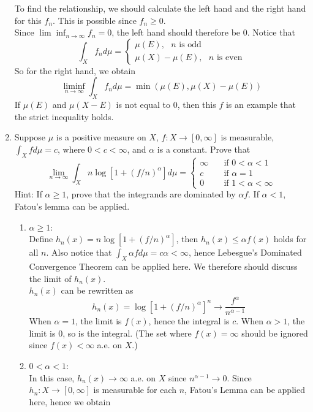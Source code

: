\documentclass{article}
\begin{document}
\begin{enumerate}
 	To find the relationship, we should calculate the left hand and the right hand for this $f_n$. This is possible since $f_n\geq0$.\\
 	Since $\lim\inf_{n\to\infty}f_n=0$, the left hand should therefore be $0$. Notice that
 	\[
 		\int_Xf_nd\mu=\begin{cases}
 		\mu(E),\text{ $n$ is odd}\\
 		\mu(X)-\mu(E),\text{ $n$ is even}
 		\end{cases}
 	\]
 	So for the right hand, we obtain
 	\[
 	\liminf_{n\to\infty}\int_Xf_nd\mu=\min(\mu(E),\mu(X)-\mu(E))
 	\]
 	If $\mu(E)$ and $\mu(X-E)$ is not equal to $0$, then this $f$ is an example that the strict inequality holds.
 	\item \exercise Suppose $\mu$ is a positive measure on $X$, $f:X\to[0,\infty]$ is measurable, $\int_Xfd\mu=c$, where $0<c<\infty$, and $\alpha$ is a constant. Prove that
 	\[
 		\lim\limits_{n\to\infty}\int_{X}n\log[1+(f/n)^{\alpha}]d\mu=\begin{cases}
 		\infty&\quad\text{if }0<\alpha<1\\
 		c&\quad\text{if }\alpha=1\\
 		0&\quad\text{if }1<\alpha<\infty
 		\end{cases}
 	\]
 	Hint: If $\alpha\geq1$, prove that the integrands are dominated by $\alpha f$. If $\alpha<1$, Fatou's lemma can be applied.\\
 	\solution
 	\begin{enumerate}
 		\item $\alpha\geq{1}$:\\
 			Define $h_n(x)=n\log[1+(f/n)^{\alpha}]$, then $h_n(x)\leq \alpha{f(x)}$ holds for all $n$. Also notice that $\int_{X}\alpha{f}d\mu=c\alpha<\infty$, hence Lebesgue's Dominated Convergence Theorem can be applied here. We therefore should discuss the limit of $h_n(x)$.\\
 			$h_n(x)$ can be rewritten as
 			\[
 				h_n(x)=\log[1+(f/n)^{\alpha}]^n\to\frac{f^{\alpha}}{n^{\alpha-1}}
 			\]
 			When $\alpha=1$, the limit is $f(x)$, hence the integral is $c$. When $\alpha>1$, the limit is $0$, so is the integral. (The set where $f(x)=\infty$ should be ignored since $f(x)<\infty$ a.e. on $X$.)\\
 		\item $0<\alpha<1$:\\
 			In this case, $h_n(x)\to\infty$ a.e. on $X$ since $n^{\alpha-1}\to{0}$. Since $h_n:X\to[0,\infty]$ is measurable for each $n$, Fatou's Lemma can be applied here, hence we obtain

\end{enumerate}
\end{enumerate}
\end{document}
